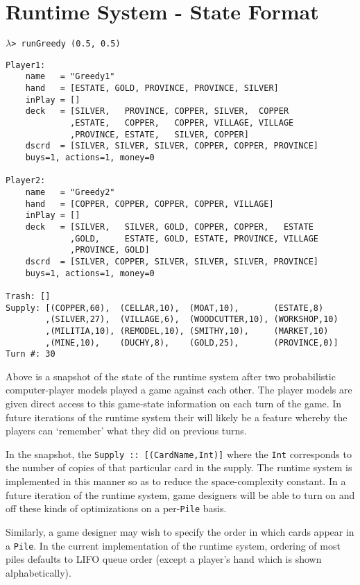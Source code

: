\section{Runtime System - State Format}
\begin{small}
$\lambda$\verb|> runGreedy (0.5, 0.5)|
\end{small}
\begin{Verbatim}[fontsize=\small]
Player1:
    name   = "Greedy1"
    hand   = [ESTATE, GOLD, PROVINCE, PROVINCE, SILVER]
    inPlay = []
    deck   = [SILVER,   PROVINCE, COPPER, SILVER,  COPPER
             ,ESTATE,   COPPER,   COPPER, VILLAGE, VILLAGE
             ,PROVINCE, ESTATE,   SILVER, COPPER]
    dscrd  = [SILVER, SILVER, SILVER, COPPER, COPPER, PROVINCE]
    buys=1, actions=1, money=0

Player2:
    name   = "Greedy2"
    hand   = [COPPER, COPPER, COPPER, COPPER, VILLAGE]
    inPlay = []
    deck   = [SILVER,   SILVER, GOLD, COPPER, COPPER,   ESTATE
             ,GOLD,     ESTATE, GOLD, ESTATE, PROVINCE, VILLAGE
             ,PROVINCE, GOLD]
    dscrd  = [SILVER, COPPER, SILVER, SILVER, SILVER, PROVINCE]
    buys=1, actions=1, money=0

Trash: []
Supply: [(COPPER,60),  (CELLAR,10),  (MOAT,10),       (ESTATE,8)
        ,(SILVER,27),  (VILLAGE,6),  (WOODCUTTER,10), (WORKSHOP,10)
        ,(MILITIA,10), (REMODEL,10), (SMITHY,10),     (MARKET,10)
        ,(MINE,10),    (DUCHY,8),    (GOLD,25),       (PROVINCE,0)]
Turn #: 30
\end{Verbatim}

Above is a snapshot of the state of the runtime system after two
probabilistic computer-player models played a game against each other.
The player models are given direct access to this game-state information
on each turn of the game. In future iterations of the runtime system
their will likely be a feature whereby the players can `remember' what
they did on previous turns.

In the snapshot, the \texttt{Supply :: [(CardName,Int)]} where
the \texttt{Int} corresponds to the number of copies of
that particular card in the supply. The runtime system is implemented in
this manner so as to reduce the space-complexity constant. In a future
iteration of the runtime system, game designers will be
able to turn on and off these kinds of optimizations on a
per-\texttt{Pile} basis.

Similarly, a game designer may wish to specify the order in which cards
appear in a \texttt{Pile}. In the current implementation
of the runtime system, ordering of most piles defaults to LIFO queue
order (except a player's hand which is shown alphabetically).

